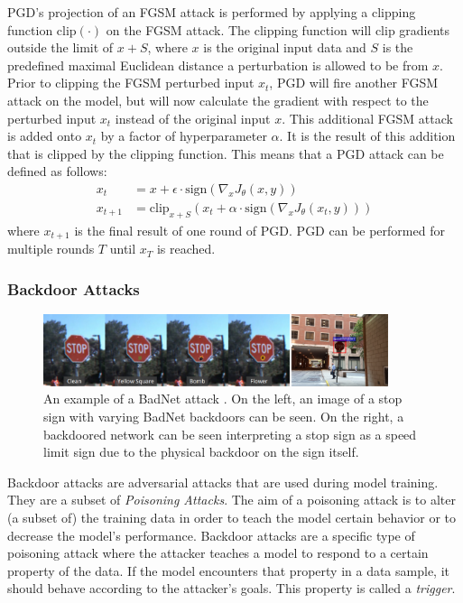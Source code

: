 \documentclass[11pt]{article}
\begin{document}
PGD's projection of an FGSM attack is performed by applying a clipping function $\text{clip}(\cdot)$ on the FGSM attack.
The clipping function will clip gradients outside the limit of $x + S$, where $x$ is the original input data and $S$ is the predefined maximal Euclidean distance a perturbation is allowed to be from $x$.
Prior to clipping the FGSM perturbed input $x_t$, PGD will fire another FGSM attack on the model, but will now calculate the gradient with respect to the perturbed input $x_t$ instead of the original input $x$.
This additional FGSM attack is added onto $x_t$ by a factor of hyperparameter $\alpha$.
It is the result of this addition that is clipped by the clipping function.
This means that a PGD attack can be defined as follows:
\begin{align*}
  x_t &= x + \epsilon \cdot \text{sign}(\nabla_x J_\theta(x, y)) \\
  x_{t+1} &= \text{clip}_{x + S}(x_t + \alpha \cdot \text{sign}(\nabla_x J_\theta(x_t, y)))
\end{align*}
where $x_{t+1}$ is the final result of one round of PGD.
PGD can be performed for multiple rounds $T$ until $x_T$ is reached. 

\subsubsection{Backdoor Attacks}
\begin{figure}[h]
  \centering
  \includegraphics[width=0.9\textwidth]{badnet.png}
  \caption{An example of a BadNet attack \citep{gu2019badnets}. On the left, an image of a stop sign with varying BadNet backdoors can be seen. On the right, a backdoored network can be seen interpreting a stop sign as a speed limit sign due to the physical backdoor on the sign itself.}
  \label{fig:badnet}
\end{figure}

Backdoor attacks are adversarial attacks that are used during model training.
They are a subset of \textit{Poisoning Attacks}.
The aim of a poisoning attack is to alter (a subset of) the training data in order to teach the model certain behavior or to decrease the model's performance.
Backdoor attacks are a specific type of poisoning attack where the attacker teaches a model to respond to a certain property of the data.
If the model encounters that property in a data sample, it should behave according to the attacker's goals.
This property is called a \textit{trigger}.
\end{document}
